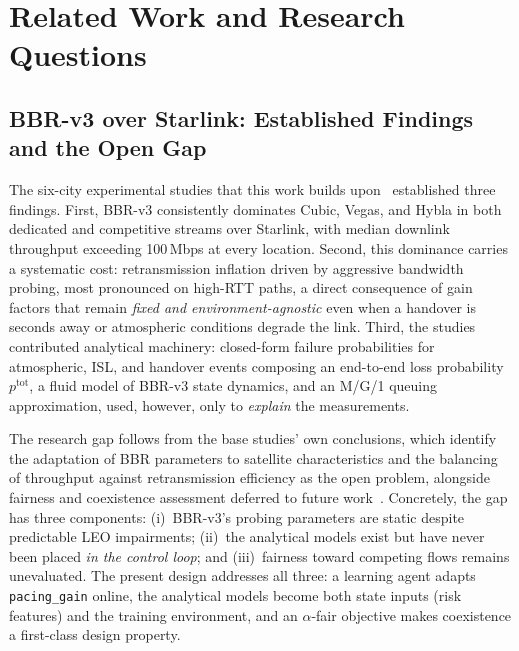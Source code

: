 \documentclass[journal]{IEEEtran}
\begin{document}
\section{Related Work and Research Questions}
\label{sec:related}

\subsection{BBR-v3 over Starlink: Established Findings and the Open Gap}
\label{sec:gap}
The six-city experimental studies that this work builds
upon~\cite{desilva2026tmc, desilva2026icoin} established three findings.
First, BBR-v3 consistently dominates Cubic, Vegas, and Hybla in both
dedicated and competitive streams over Starlink, with median downlink
throughput exceeding 100\,Mbps at every location. Second, this dominance
carries a systematic cost: retransmission inflation driven by aggressive
bandwidth probing, most pronounced on high-RTT paths, a direct consequence
of gain factors that remain \emph{fixed and environment-agnostic} even when
a handover is seconds away or atmospheric conditions degrade the link.
Third, the studies contributed analytical machinery: closed-form failure
probabilities for atmospheric, ISL, and handover events composing an
end-to-end loss probability $p^{\mathrm{tot}}$, a fluid model of BBR-v3
state dynamics, and an M/G/1 queuing approximation, used, however, only to
\emph{explain} the measurements.

The research gap follows from the base studies' own conclusions, which
identify the adaptation of BBR parameters to satellite characteristics and
the balancing of throughput against retransmission efficiency as the open
problem, alongside fairness and coexistence assessment deferred to future
work~\cite{desilva2026tmc, desilva2026icoin}. Concretely, the gap has three
components: (i)~BBR-v3's probing parameters are static despite predictable
LEO impairments; (ii)~the analytical models exist but have never been placed
\emph{in the control loop}; and (iii)~fairness toward competing flows
remains unevaluated. The present design addresses all three: a learning
agent adapts \texttt{pacing\_gain} online, the analytical models become both
state inputs (risk features) and the training environment, and an
$\alpha$-fair objective makes coexistence a first-class design property.
\end{document}
